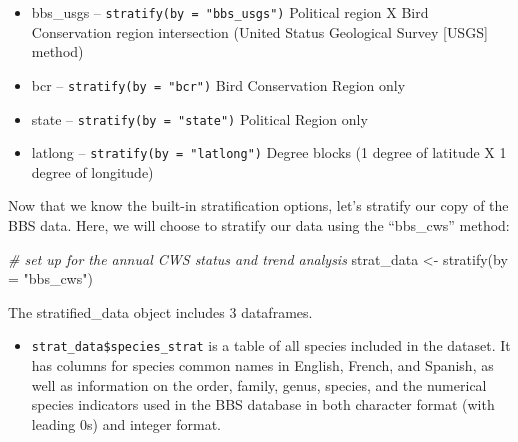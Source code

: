 \documentclass[
]{book}
\newenvironment{Shaded}{\begin{snugshade}}{\end{snugshade}}
\newcommand{\AttributeTok}[1]{\textcolor[rgb]{0.77,0.63,0.00}{#1}}
\newcommand{\CommentTok}[1]{\textcolor[rgb]{0.56,0.35,0.01}{\textit{#1}}}
\newcommand{\DecValTok}[1]{\textcolor[rgb]{0.00,0.00,0.81}{#1}}
\newcommand{\FunctionTok}[1]{\textcolor[rgb]{0.00,0.00,0.00}{#1}}
\newcommand{\NormalTok}[1]{#1}
\newcommand{\OtherTok}[1]{\textcolor[rgb]{0.56,0.35,0.01}{#1}}
\newcommand{\SpecialCharTok}[1]{\textcolor[rgb]{0.00,0.00,0.00}{#1}}
\newcommand{\StringTok}[1]{\textcolor[rgb]{0.31,0.60,0.02}{#1}}
\providecommand{\tightlist}{%
  \setlength{\itemsep}{0pt}\setlength{\parskip}{0pt}}
\begin{document}
\begin{itemize}
\tightlist
\item
  bbs\_usgs -- \texttt{stratify(by\ =\ "bbs\_usgs")} Political region X Bird Conservation region intersection (United Status Geological Survey {[}USGS{]} method)
\end{itemize}

\begin{itemize}
\tightlist
\item
  bcr -- \texttt{stratify(by\ =\ "bcr")} Bird Conservation Region only
\end{itemize}

\begin{itemize}
\tightlist
\item
  state -- \texttt{stratify(by\ =\ "state")} Political Region only
\end{itemize}

\begin{itemize}
\tightlist
\item
  latlong -- \texttt{stratify(by\ =\ "latlong")} Degree blocks (1 degree of latitude X 1 degree of longitude)
\end{itemize}

Now that we know the built-in stratification options, let's stratify our copy of the BBS data. Here, we will choose to stratify our data using the ``bbs\_cws'' method:

\begin{Shaded}
\begin{Highlighting}[]
\CommentTok{\# set up for the annual CWS status and trend analysis}
\NormalTok{strat\_data }\OtherTok{\textless{}{-}} \FunctionTok{stratify}\NormalTok{(}\AttributeTok{by =} \StringTok{"bbs\_cws"}\NormalTok{)}
\end{Highlighting}
\end{Shaded}

The stratified\_data object includes 3 dataframes.

\begin{itemize}
\tightlist
\item
  \texttt{strat\_data\$species\_strat} is a table of all species included in the dataset. It has columns for species common names in English, French, and Spanish, as well as information on the order, family, genus, species, and the numerical species indicators used in the BBS database in both character format (with leading 0s) and integer format.
\end{itemize}

\begin{Shaded}
\end{Shaded}
\end{document}
